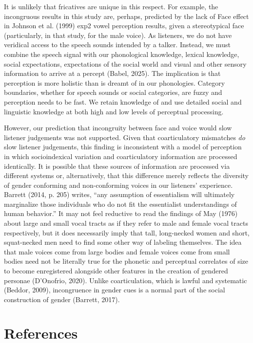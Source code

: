 \documentclass[
  letterpaper,
  DIV=11,
  numbers=noendperiod]{scrartcl}
\begin{document}
It is unlikely that fricatives are unique in this respect. For example,
the incongruous results in this study are, perhaps, predicted by the
lack of Face effect in Johnson et al. (1999) exp2 vowel perception
results, given a stereotypical face (particularly, in that study, for
the male voice). As listeners, we do not have veridical access to the
speech sounds intended by a talker. Instead, we must combine the speech
signal with our phonological knowledge, lexical knowledge, social
expectations, expectations of the social world and visual and other
sensory information to arrive at a percept (Babel, 2025). The
implication is that perception is more holistic than is dreamt of in our
phonologies. Category boundaries, whether for speech sounds or social
categories, are fuzzy and perception needs to be fast. We retain
knowledge of and use detailed social and linguistic knowledge at both
high and low levels of perceptual processing.

However, our prediction that incongruity between face and voice would
slow listener judgements was not supported. Given that coarticulatory
mismatches \emph{do} slow listener judgements, this finding is
inconsistent with a model of perception in which socioindexical
variation and coarticulatory information are processed identically. It
is possible that these sources of information are processed via
different systems or, alternatively, that this difference merely
reflects the diversity of gender conforming and non-conforming voices in
our listeners' experience. Barrett (2014, p. 205) writes, ``any
assumption of essentialism will ultimately marginalize those individuals
who do not fit the essentialist understandings of human behavior.'' It
may not feel reductive to read the findings of May (1976) about large
and small vocal tracts as if they refer to male and female vocal tracts
respectively, but it does necessarily imply that tall, long-necked women
and short, squat-necked men need to find some other way of labeling
themselves. The idea that male voices come from large bodies and female
voices come from small bodies need not be literally true for the
phonetic and perceptual correlates of size to become enregistered
alongside other features in the creation of gendered personae
(D'Onofrio, 2020). Unlike coarticulation, which is lawful and systematic
(Beddor, 2009), incongruence in gender cues is a normal part of the
social construction of gender (Barrett, 2017).

\section*{References}\label{sec-references}
\end{document}
